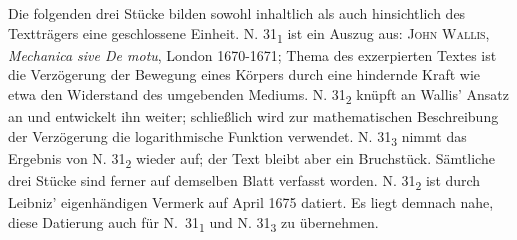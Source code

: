 \footnotesize
\pstart
\noindent
Die folgenden drei St\"{u}cke bilden sowohl inhaltlich als auch hinsichtlich des Texttr\"{a}gers eine geschlossene Einheit. N. 31\textsubscript{1} ist ein Auszug aus: \cite{00301}\cite{01008}\textsc{John Wallis}, \textit{Mechanica sive De motu}, London 1670-1671; Thema des exzerpierten Textes ist die Verz\"{o}gerung der Bewegung eines K\"{o}rpers durch eine hindernde Kraft wie etwa den Widerstand des umgebenden Mediums. N. 31\textsubscript{2} kn\"{u}pft an Wallis' Ansatz an und entwickelt ihn weiter; schließlich wird zur mathematischen Beschreibung der Verz\"{o}gerung die logarithmische Funktion verwendet. N. 31\textsubscript{3} nimmt das Ergebnis von N. 31\textsubscript{2} wieder auf; der Text bleibt aber ein Bruchst\"{u}ck. S\"{a}mtliche drei St\"{u}cke sind ferner auf demselben Blatt verfasst worden. N. 31\textsubscript{2} ist durch Leibniz' eigen\-h\"{a}ndigen Vermerk auf April 1675 datiert. Es liegt demnach nahe, diese Datierung auch f\"{u}r N.~31\textsubscript{1} und N. 31\textsubscript{3} zu \"{u}bernehmen.
\pend 
\normalsize 